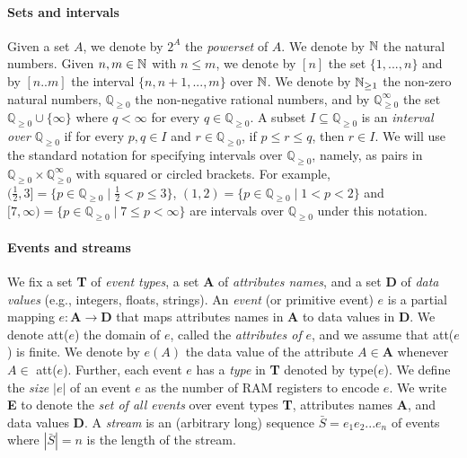 
\paragraph{Sets and intervals} Given a set $A$, we denote by $2^A$ the \textit{powerset} of $A$. We denote by $\mathbb{N}$ the natural numbers. Given $n,m \in \mathbb{N}$ with $n\leq m$, we denote by $[n]$ the set $\{1,...,n\}$ and by $[n..m]$ the interval $\{n, n+1, ..., m\}$ over $\mathbb{N}$. 
We denote by $\mathbb{N}_{\geq 1}$ the non-zero natural numbers, $\mathbb{Q}_{\geq 0}$ the non-negative rational numbers, and by $\mathbb{Q}_{\geq 0}^\infty$ the set $\mathbb{Q}_{\geq 0} \cup \{\infty\}$ where $q < \infty$ for every $q \in \mathbb{Q}_{\geq 0}$.
A subset $I \subseteq \mathbb{Q}_{\geq 0}$ is an \textit{interval over} $\mathbb{Q}_{\geq 0}$ if for every $p,q\in I$ and $r\in \mathbb{Q}_{\geq 0}$, if $p\leq r\leq q$, then $r\in I$.
We will use the standard notation for specifying intervals over $\mathbb{Q}_{\geq 0}$, namely, as pairs in $\mathbb{Q}_{\geq 0}\times\mathbb{Q}_{\geq 0}^\infty$ with squared or circled brackets. 
For example, $(\frac{1}{2},3] = \{p\in \mathbb{Q}_{\geq 0} \mid \frac{1}{2} < p \leq 3\}$, $(1,2) = \{p\in \mathbb{Q}_{\geq 0} \mid 1 < p < 2\}$ and $[7,\infty) = \{p\in \mathbb{Q}_{\geq 0} \mid 7 \leq p < \infty\}$ are intervals over $\mathbb{Q}_{\geq 0}$ under this notation.

\paragraph{Events and streams} We fix a set \textbf{T} of \textit{event types}, a set \textbf{A} of \textit{attributes names}, and a set \textbf{D} of \textit{data values} (e.g., integers, floats, strings).
An \textit{event} (or primitive event) $e$ is a partial mapping $e: \textbf{A} \rightarrow \textbf{D}$ that maps attributes names in \textbf{A} to data values in \textbf{D}.
We denote att($e$) the domain of $e$, called the \textit{attributes of} $e$, and we assume that att($e$) is finite.
We denote by $e(A)$ the data value of the attribute $A\in\textbf{A}$ whenever $A\in$ att($e$).
Further, each event $e$ has a \textit{type} in \textbf{T} denoted by type($e$). 
We define the \textit{size} $|e|$ of an event $e$ as the number of RAM registers to encode $e$.
We write \textbf{E} to denote the \textit{set of all events} over event types \textbf{T}, attributes names \textbf{A}, and data values \textbf{D}.
A \textit{stream} is an (arbitrary long) sequence $\bar{S} = e_1e_2...e_n$ of events where $|\bar{S}|=n$ is the length of the stream.

